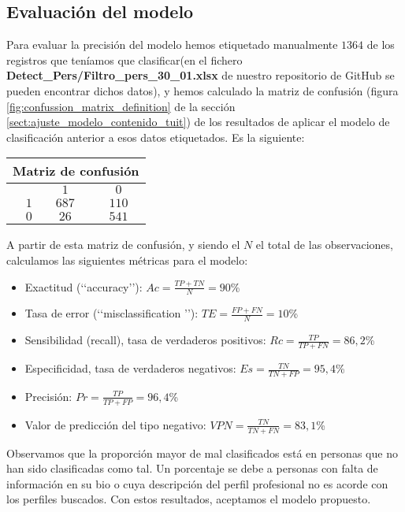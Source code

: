 \subsection{Evaluación del modelo}
Para evaluar la precisión del modelo hemos etiquetado manualmente $1364$ de los registros que 
teníamos que clasificar(en el fichero 
{\bf Detect\_Pers/Filtro\_pers\_30\_01.xlsx} de nuestro repositorio de GitHub se pueden encontrar
dichos datos), 
y hemos calculado la matriz de confusión (figura \ref{fig:confussion_matrix_definition} 
de la sección \ref{sect:ajuste_modelo_contenido_tuit}) de los resultados de aplicar el
modelo de clasificación anterior a esos datos etiquetados. Es la siguiente:

\begin{center}
\begin{tabular}{r|cc}
\multicolumn{3}{c}{\bf Matriz de confusión} \\
\hline
\hline
     &$1$&$0$\\
\hline
$1$&$687$&$110$\\
\hline
$0$&$26$&$541$\\
\hline
\end{tabular}
\end{center}

A partir de esta matriz de confusión, y siendo el $N$ el total de las observaciones,
calculamos las siguientes métricas para el modelo:
\begin{itemize}
\item Exactitud (\lq\lq accuracy\rq\rq): $\displaystyle Ac =\frac{TP+TN}{N} = 90$\%	
\item Tasa de error (\lq\lq misclassification \rq\rq): $\displaystyle TE =\frac{FP+FN}N = 10$\%
\item Sensibilidad (recall), tasa de verdaderos positivos:												
$\displaystyle Rc =\frac{TP}{TP+FN}= 86,2$\%
\item Especificidad, tasa de verdaderos negativos:														
$\displaystyle Es =\frac{TN}{TN+FP}= 95,4$\%			
\item Precisión:													
$\displaystyle Pr =\frac{TP}{TP+FP}= 96,4$\%	
\item Valor de predicción del tipo negativo:
$\displaystyle VPN =\frac{TN}{TN+FN}= 83,1$\%										
\end{itemize}														
														
Observamos que la proporción mayor de mal clasificados está en personas que no han sido 
clasificadas como tal. Un porcentaje se debe a personas con falta de información  en su bio 
o cuya descripción del perfil profesional no es acorde con los perfiles buscados. 
Con estos resultados, aceptamos el modelo propuesto.

